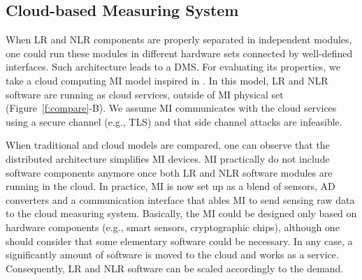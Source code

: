 \documentclass[journal]{IEEEtran} %
\begin{document}
\subsection{Cloud-based Measuring System}
\label{s:mi_cloud}
When LR and NLR components are properly separated in independent modules, one could run these modules in different hardware sets connected by well-defined interfaces. Such architecture leads to a DMS. For evaluating its properties, we take a cloud computing MI model inspired in \cite{Oppermann2016}. In this model, LR and NLR software are running as cloud services, outside of MI physical set (Figure~\ref{f:compare}-B). We assume MI communicates with the cloud services using a secure channel (e.g., TLS) and that side channel attacks are infeasible.

When traditional and cloud models are compared, one can observe that the distributed architecture simplifies MI devices. MI practically do not include software components anymore once both LR and NLR software modules are running in the cloud. In practice, MI is now set up as a blend of sensors, AD converters and a communication interface that ables MI to send sensing raw data to the cloud measuring system. Basically, the MI could be designed only based on hardware components (e.g., smart sensors, cryptographic chips), although one should consider that some elementary software could be necessary. In any case, a significantly amount of software is moved to the cloud and works as a service. Consequently, LR and NLR software can be scaled accordingly to the demand.

\end{document}
